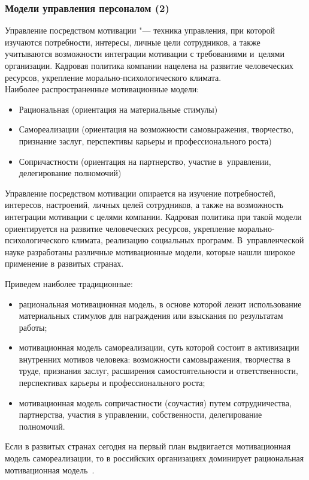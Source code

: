 \documentclass{../industrial-development}
\begin{document}
\begin{frame} \frametitle{Модели управления персоналом (2)}
	\alert{Управление посредством мотивации} "--- техника управления, при которой изучаются потребности, интересы, личные цели сотрудников, а также учитываются возможности интеграции мотивации с требованиями и~целями организации. Кадровая политика компании нацелена на развитие человеческих ресурсов, укрепление морально-психологического климата. 
	\\ Наиболее распространенные мотивационные модели:
	\begin{itemize}
		\item Рациональная (ориентация на материальные стимулы)
		\item Самореализации (ориентация на возможности самовыражения,
		творчество, признание заслуг, перспективы карьеры и профессионального роста)
		\item Сопричастности (ориентация на партнерство, участие в~управлении, делегирование полномочий)
	\end{itemize}
\end{frame}
\lecturenotes

\alert{Управление посредством мотивации} опирается на изучение потребностей, интересов, настроений, личных целей сотрудников, а также на возможность интеграции мотивации с целями компании. Кадровая политика при такой модели ориентируется на развитие человеческих ресурсов, укрепление морально-психологического климата, реализацию социальных программ. В~управленческой науке разработаны различные мотивационные модели, которые нашли широкое применение в развитых странах.

Приведем наиболее традиционные:
\begin{itemize}
	\item рациональная мотивационная модель, в основе которой лежит использование материальных стимулов для награждения или взыскания по результатам работы;
	\item мотивационная модель самореализации, суть которой состоит в активизации внутренних мотивов человека: возможности самовыражения, творчества в труде, признания заслуг, расширения самостоятельности и ответственности, перспективах карьеры и профессионального роста;
	\item мотивационная модель сопричастности (соучастия) путем сотрудничества, партнерства, участия в управлении, собственности, делегирование полномочий.
\end{itemize}
Если в развитых странах сегодня на первый план выдвигается мотивационная модель самореализации, то в российских организациях доминирует рациональная мотивационная модель~\cite{Porshnev}. 
\end{document}
